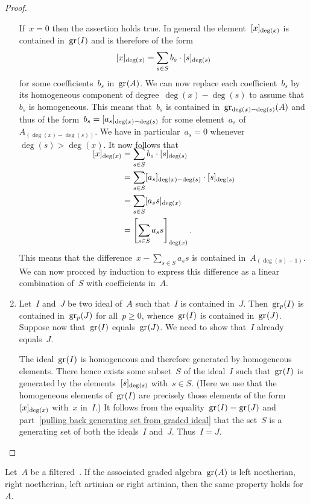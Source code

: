 \begin{proof}
\begin{enumerate}
			If~$x = 0$ then the assertion holds true.
			In general the element~$\lbrack x\rbrack_{\deg(x)}$ is contained in~$\gr(I)$ and is therefore of the form
			\[
				\lbrack x\rbrack_{\deg(x)}
				=
				\sum_{s \in S} b_s \cdot \lbrack s \rbrack_{\deg(s)}
			\]
			for some coefficients~$b_s$ in~$\gr(A)$.
			We can now replace each coefficient~$b_s$ by its homogeneous component of degree~$\deg(x) - \deg(s)$ to assume that~$b_s$ is homogeneous.
			This means that~$b_s$ is contained in~$\gr[\deg(x)-\deg(s)](A)$ and thus of the form~$b_s = \lbrack a_s\rbrack_{\deg(x)-\deg(s)}$ for some element~$a_s$ of~$A_{(\deg(x)-\deg(s))}$.
			We have in particular~$a_s = 0$ whenever~$\deg(s) > \deg(x)$.
			It now follows that
			\begin{align*}
				\SwapAboveDisplaySkip
				\fclass{x}_{\deg(x)}
				&=
				\sum_{s \in S} b_s \cdot \fclass{ s }_{\deg(s)}
				\\
				&=
				\sum_{s \in S} \fclass{ a_s }_{\deg(x) - \deg(s)} \cdot \fclass{ s }_{\deg(s)}
				\\
				&=
				\sum_{s \in S} \fclass{ a_s s }_{\deg(x)}
				\\
				&=
				\fclass*{ \sum_{s \in S} a_s s }_{\deg(x)} \,.
			\end{align*}
			This means that the difference~$x - \sum_{s \in S} a_s s$ is contained in~$A_{(\deg(x)-1)}$.
			We can now procced by induction to express this difference as a linear combination of~$S$ with coefficients in~$A$.
		\item
			Let~$I$ and~$J$ be two ideal of~$A$ such that~$I$ is contained in~$J$.
			Then~$\gr[p](I)$ is contained in~$\gr[p](J)$ for all~$p \geq 0$, whence~$\gr(I)$ is contained in~$\gr(J)$.
			Suppose now that~$\gr(I)$ equals~$\gr(J)$.
			We need to show that~$I$ already equals~$J$.

			The ideal~$\gr(I)$ is homogeneous and therefore generated by homogeneous elements.
			There hence exists some subset~$S$ of the ideal~$I$ such that~$\gr(I)$ is generated by the elements~$\lbrack s\rbrack_{\deg(s)}$ with~$s \in S$.
			(Here we use that the homogeneous elements of~$\gr(I)$ are precisely those elements of the form~$\lbrack x\rbrack_{\deg(x)}$ with~$x$ in~$I$.)
			It follows from the equality~$\gr(I) = \gr(J)$ and part~\ref*{pulling back generating set from graded ideal} that the set~$S$ is a generating set of both the ideals~$I$ and~$J$.
			Thus~$I = J$.
		\qedhere
	\end{enumerate}
\end{proof}


\begin{corollary}
	\label{universal enveloping reflects chain conditions}
	Let~$A$ be a filtered~\algebra{$\kf$}.
	If the associated graded algebra~$\gr(A)$ is left noetherian, right noetherian, left artinian or right artinian, then the same property holds for~$A$.
\end{corollary}


